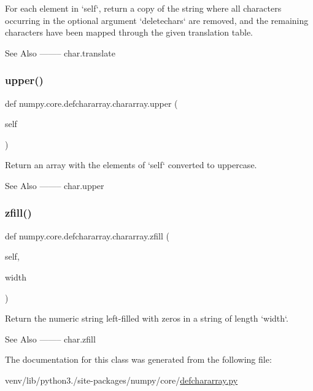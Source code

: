 \begin{DoxyVerb}For each element in `self`, return a copy of the string where
all characters occurring in the optional argument
`deletechars` are removed, and the remaining characters have
been mapped through the given translation table.

See Also
--------
char.translate\end{DoxyVerb}
 \mbox{\label{classnumpy_1_1core_1_1defchararray_1_1chararray_a80eb99eae67682a06ce819c116177227}} 
\subsubsection{\texorpdfstring{upper()}{upper()}}
{\footnotesize\ttfamily def numpy.\+core.\+defchararray.\+chararray.\+upper (\begin{DoxyParamCaption}\item[{}]{self }\end{DoxyParamCaption})}

\begin{DoxyVerb}Return an array with the elements of `self` converted to
uppercase.

See Also
--------
char.upper\end{DoxyVerb}
 \mbox{\label{classnumpy_1_1core_1_1defchararray_1_1chararray_a80c7bb46a816b9e11981159b9e3235df}} 
\subsubsection{\texorpdfstring{zfill()}{zfill()}}
{\footnotesize\ttfamily def numpy.\+core.\+defchararray.\+chararray.\+zfill (\begin{DoxyParamCaption}\item[{}]{self,  }\item[{}]{width }\end{DoxyParamCaption})}

\begin{DoxyVerb}Return the numeric string left-filled with zeros in a string of
length `width`.

See Also
--------
char.zfill\end{DoxyVerb}
 

The documentation for this class was generated from the following file\+:\begin{DoxyCompactItemize}
\item 
venv/lib/python3./site-\/packages/numpy/core/\hyperlink{defchararray_8py}{defchararray.\+py}\end{DoxyCompactItemize}
